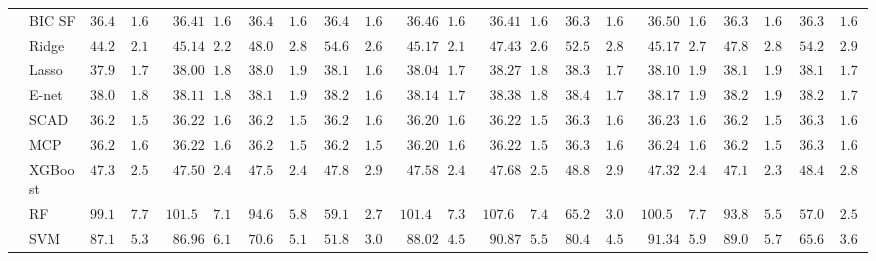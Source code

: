 \begin{tabular}{ll|ll|llllll|llllll|llllll}
 & BIC SF  & $36.46$ & $1.63$ & $\phantom{0}36.41$ & $1.69$ & $36.47$ & $1.63$ & $36.43$ & $1.62$ & $\phantom{0}36.46$ & $1.64$ & $\phantom{0}36.41$ & $1.62$ & $36.36$ & $1.64$ & $\phantom{0}36.50$ & $1.64$ & $36.39$ & $1.64$ & $36.31$ & $1.64$ \\
 & Ridge  & $44.28$ & $2.16$ & $\phantom{0}45.14$ & $2.23$ & $48.00$ & $2.84$ & $54.66$ & $2.64$ & $\phantom{0}45.17$ & $2.18$ & $\phantom{0}47.43$ & $2.67$ & $52.52$ & $2.85$ & $\phantom{0}45.17$ & $2.71$ & $47.83$ & $2.83$ & $54.24$ & $2.93$ \\
 & Lasso  & $37.97$ & $1.79$ & $\phantom{0}38.00$ & $1.83$ & $38.06$ & $1.93$ & $38.16$ & $1.66$ & $\phantom{0}38.04$ & $1.77$ & $\phantom{0}38.27$ & $1.81$ & $38.38$ & $1.77$ & $\phantom{0}38.10$ & $1.94$ & $38.12$ & $1.99$ & $38.13$ & $1.76$ \\
 & E-net  & $38.07$ & $1.84$ & $\phantom{0}38.11$ & $1.85$ & $38.15$ & $1.95$ & $38.24$ & $1.68$ & $\phantom{0}38.14$ & $1.78$ & $\phantom{0}38.38$ & $1.82$ & $38.46$ & $1.77$ & $\phantom{0}38.17$ & $1.96$ & $38.23$ & $1.99$ & $38.21$ & $1.76$ \\
 & SCAD  & $36.21$ & $1.59$ & $\phantom{0}36.22$ & $1.60$ & $36.21$ & $1.59$ & $36.26$ & $1.61$ & $\phantom{0}36.20$ & $1.64$ & $\phantom{0}36.22$ & $1.58$ & $36.34$ & $1.65$ & $\phantom{0}36.23$ & $1.62$ & $36.21$ & $1.58$ & $36.30$ & $1.64$ \\
 & MCP  & $36.21$ & $1.60$ & $\phantom{0}36.22$ & $1.61$ & $36.22$ & $1.59$ & $36.24$ & $1.59$ & $\phantom{0}36.20$ & $1.64$ & $\phantom{0}36.22$ & $1.58$ & $36.35$ & $1.66$ & $\phantom{0}36.24$ & $1.63$ & $36.20$ & $1.57$ & $36.32$ & $1.62$ \\
 & XGBoost  & $47.39$ & $2.56$ & $\phantom{0}47.50$ & $2.42$ & $47.56$ & $2.45$ & $47.85$ & $2.96$ & $\phantom{0}47.58$ & $2.48$ & $\phantom{0}47.68$ & $2.58$ & $48.83$ & $2.97$ & $\phantom{0}47.32$ & $2.48$ & $47.18$ & $2.36$ & $48.47$ & $2.81$ \\
 & RF  & $99.19$ & $7.73$ & $101.52$ & $7.11$ & $94.67$ & $5.82$ & $59.16$ & $2.74$ & $101.49$ & $7.30$ & $107.66$ & $7.45$ & $65.28$ & $3.08$ & $100.55$ & $7.76$ & $93.89$ & $5.55$ & $57.07$ & $2.58$ \\
 & SVM  & $87.11$ & $5.38$ & $\phantom{0}86.96$ & $6.15$ & $70.61$ & $5.12$ & $51.82$ & $3.09$ & $\phantom{0}88.02$ & $4.57$ & $\phantom{0}90.87$ & $5.51$ & $80.44$ & $4.52$ & $\phantom{0}91.34$ & $5.95$ & $89.09$ & $5.76$ & $65.65$ & $3.63$ \\
\hline 
\end{tabular}

